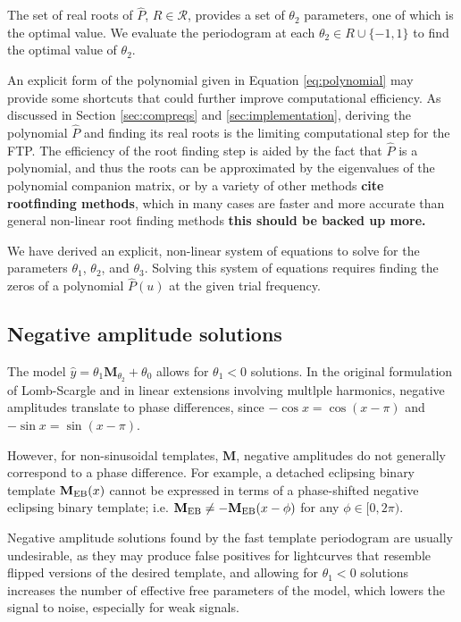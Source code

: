 \documentclass[apj]{emulateapj}
\newcommand{\todo}[1]{{\bf #1}}
\newcommand{\Mshft}{\mathbf{M}_{\theta_2}}
\begin{document}
The set of real roots of $\hat{P}$, $R\in \mathcal{R}$, provides a set of $\theta_2$ parameters,
one of which is the optimal value. We evaluate the periodogram at each $\theta_2 \in R\cup\{-1,1\}$
to find the optimal value of $\theta_2$.


An explicit form of the polynomial given in Equation \ref{eq:polynomial} may provide some
shortcuts that could further improve computational efficiency. As discussed in Section
\ref{sec:compreqs} and \ref{sec:implementation}, deriving the polynomial $\hat{P}$ and finding
its real roots is the limiting computational step for the FTP. The efficiency of the root finding step
is aided by the fact that $\hat{P}$ is a polynomial, and thus the roots can be approximated 
by the eigenvalues of the polynomial companion matrix, or by a variety of other methods \todo{cite rootfinding
methods}, which in many cases are faster and more accurate than general non-linear root finding methods
\todo{this should be backed up more.}

We have derived an explicit, non-linear system of equations to solve for
the parameters $\theta_1$, $\theta_2$, and $\theta_3$. Solving this system of equations
requires finding the zeros of a polynomial $\hat{P}(u)$ at the given trial frequency.


\subsection{Negative amplitude solutions}
The model $\hat{y}= \theta_1\Mshft + \theta_0$ allows for $\theta_1 < 0$ solutions. 
In the original formulation of Lomb-Scargle and in linear
extensions involving multlple harmonics, negative amplitudes translate to
phase differences, since $-\cos{x} = \cos(x - \pi)$ and $-\sin{x} = \sin(x - \pi)$.

However, for non-sinusoidal templates, $\mathbf{M}$, negative amplitudes
do not generally correspond to a phase difference. For example, a 
detached eclipsing binary template $\mathbf{M}_{\rm EB}(x)$ cannot be 
expressed in terms of a phase-shifted negative eclipsing binary template; i.e.
$\mathbf{M}_{\rm EB} \neq - \mathbf{M}_{\rm EB}(x - \phi)$ for any $\phi\in[0, 2\pi)$.

Negative amplitude solutions found by the fast template periodogram are usually
undesirable, as they may produce false positives for lightcurves that resemble
flipped versions of the desired template, and allowing for $\theta_1 < 0$ solutions
increases the number of effective free parameters of the model, which lowers
the signal to noise, especially for weak signals.
\end{document}
